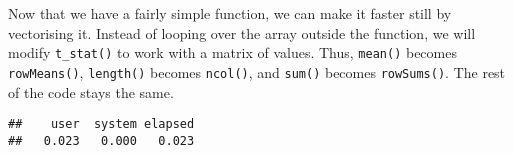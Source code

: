 Now that we have a fairly simple function, we can make it faster still
by vectorising it. Instead of looping over the array outside the
function, we will modify \texttt{t\_stat()} to work with a matrix of
values. Thus, \texttt{mean()} becomes \texttt{rowMeans()},
\texttt{length()} becomes \texttt{ncol()}, and \texttt{sum()} becomes
\texttt{rowSums()}. The rest of the code stays the same.

\begin{Shaded}
\begin{Highlighting}[]
\StringTok{ }
\StringTok{ }
\StringTok{ }
\StringTok{ }
\StringTok{ }\OperatorTok{-}\StringTok{ }\OperatorTok{^}\StringTok{ }\NormalTok{) }\OperatorTok{/}\StringTok{ }\OperatorTok{-}\StringTok{ }\NormalTok{)}

    \NormalTok{(}
\NormalTok{  \}}

\StringTok{ }\NormalTok{(X[, grp }\OperatorTok{==}\StringTok{ }\NormalTok{])}
\StringTok{ }\NormalTok{(X[, grp }\OperatorTok{==}\StringTok{ }\NormalTok{])}

\StringTok{ }\OperatorTok{$}\OperatorTok{/}\StringTok{ }\OperatorTok{$}\OperatorTok{+}\StringTok{ }\OperatorTok{$}\OperatorTok{/}\StringTok{ }\OperatorTok{$}
\OperatorTok{$}\OperatorTok{-}\StringTok{ }\OperatorTok{$}\OperatorTok{/}\StringTok{ }
\NormalTok{\}}
\StringTok{ }
\end{Highlighting}
\end{Shaded}

\begin{verbatim}
##    user  system elapsed 
##   0.023   0.000   0.023
\end{verbatim}

